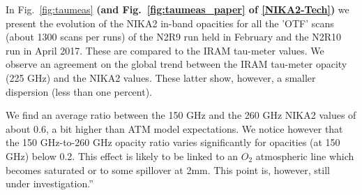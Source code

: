 In Fig.~\ref{fig:taumeas} {\bf(and Fig.~\ref{fig:taumeas_paper} of
  \ref{NIKA2-Tech}) } we present the evolution of the NIKA2 in-band
opacities for all the 'OTF' scans (about 1300 scans per runs) of the
N2R9 run held in February and the N2R10 run in April 2017. These are
compared to the IRAM tau-meter values. We observe an agreement on the global trend between the IRAM tau-meter opacity
(225 GHz) and the NIKA2 values. These latter show, however,
a smaller dispersion (less than one percent).


We find an average ratio between the 150 GHz and the 260 GHz NIKA2 values of
about 0.6, a bit higher than ATM model expectations. We notice however that
the 150 GHz-to-260 GHz opacity ratio varies significantly for opacities (at
150 GHz) below 0.2. This effect is likely to be linked to an $O_2$ atmospheric
line which becomes saturated or to some spillover at 2mm. This point is,
however, still under investigation.''




